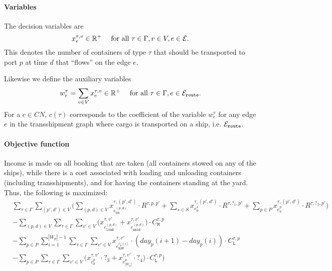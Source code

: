 \paragraph{Variables}
The decision variables are 
\[
x^{\tau,v}_e \in \mathbb{R}^+\quad \text{ for all } \tau\in \Gamma, v\in V, e\in \mathcal{E}.
\]
This denotes the number of containers of type $\tau$ that should be transported to port $p$ at time $d$ that ``flows'' on the edge $e$.

Likewise we define the auxiliary variables 
\[
w^{\tau}_e = \sum_{v\in V}x^{\tau,v}_e \in \mathbb{R}^+ \quad \text{ for all } \tau\in \Gamma, e\in \mathcal{E}_{\texttt{route}}. 
\]
For a $c\in CN$, $c(\tau)$ corresponds to the coefficient of the variable $w^\tau_e$ for any edge $e$ in the transshipment graph where cargo is transported on a ship, i.e. $\mathcal{E}_{\texttt{route}}$.
%
\paragraph{Objective function}
Income is made on all booking that are taken (all containers stowed on any of the ships), while there is a cost associated with loading and unloading containers (including transshipments), and for having the containers standing at the yard. Thus, the following is maximized:
\begin{align*}
&\sum_{\tau\in\Gamma}\sum_{(p',d') \in V}\Big(\sum_{(p,d) \in V}x^{\tau,(p',d')}_{e^{(p,d)}_{\texttt{on}}}\cdot R^{\tau,p,p'}
+ \sum_{s \in S} x^{\tau,(p',d')}_{e^{s}_{0}}\cdot R^{\tau,?_1,p'} 
+ \sum_{p \in P}x^{\tau,(p',d')}_{e^{p}_{0}}\cdot R^{\tau,?_2,p'}\Big)\\
%
&-\sum_{(p,d) \in V}\sum_{\tau\in\Gamma}\sum_{v' \in V}\big(x^{\tau,v'}_{e^{(p,d)}_{\texttt{load}}} + x^{\tau,v'}_{e^{(p,d)}_{\texttt{unld}}}\big)\cdot C^{\tau,p}_{\texttt{M}}\\
&-\sum_{p \in P}\sum_{i =1}^{|W_p|-1}\sum_{\tau\in\Gamma}\sum_{v' \in V}x^{\tau,v'}_{e^{v_p(i)}_{\texttt{nxP}}}\cdot(\mathit{day}_p(i+1)-\mathit{day}_p(i))\cdot C^{\tau,p}_{\texttt{L}}\\
&-\sum_{p \in P}\sum_{\tau\in\Gamma}\sum_{v' \in V}\big(x^{\tau,v'}_{e^{p}_{0}}\cdot ?_3 + x^{\tau,v'}_{e^{p}_{|W_p|}}\cdot ?_4\big)\cdot C^{\tau,p}_{\texttt{L}} )\\
\end{align*}

